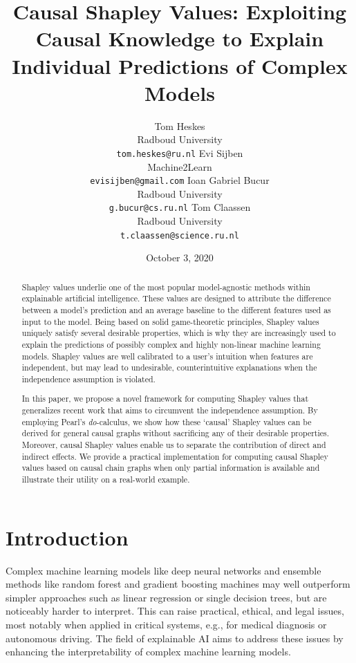 \documentclass{article}
\title{Causal Shapley Values: Exploiting Causal Knowledge to Explain Individual Predictions of Complex Models}
\author{%
  Tom Heskes\\
  Radboud University\\
  \texttt{tom.heskes@ru.nl}
  \And
  Evi Sijben\\
  Machine2Learn\\
  \texttt{evisijben@gmail.com}
  \AND
  Ioan Gabriel Bucur \\
  Radboud University \\
  \texttt{g.bucur@cs.ru.nl}
  \And
  Tom Claassen\\
  Radboud University \\
  \texttt{t.claassen@science.ru.nl}
}
\date{October 3, 2020}
\begin{document}
\maketitle

\begin{abstract}
Shapley values underlie one of the most popular model-agnostic methods within explainable artificial intelligence. These values are designed to attribute the difference between a model's prediction and an average baseline to the different features used as input to the model. Being based on solid game-theoretic principles, Shapley values uniquely satisfy several desirable properties, which is why they are increasingly used to explain the predictions of possibly complex and highly non-linear machine learning models. Shapley values are well calibrated to a user’s intuition when features are independent, but may lead to undesirable, counterintuitive explanations when the independence assumption is violated.

In this paper, we propose a novel framework for computing Shapley values that generalizes recent work that aims to circumvent the independence assumption. By employing Pearl's \textit{do}-calculus, we show how these `causal' Shapley values can be derived for general causal graphs without sacrificing any of their desirable properties. Moreover, causal Shapley values enable us to separate the contribution of direct and indirect effects. We provide a practical implementation for computing causal Shapley values based on causal chain graphs when only partial information is available and illustrate their utility on a real-world example.
\end{abstract}


\section{Introduction}
Complex machine learning models like deep neural networks and ensemble methods like random forest and gradient boosting machines may well outperform simpler approaches such as linear regression or single decision trees, but are noticeably harder to interpret. This can raise practical, ethical, and legal issues, most notably when applied in critical systems, e.g., for medical diagnosis or autonomous driving. The field of explainable AI aims to address these issues by enhancing the interpretability of complex machine learning models.
\end{document}
